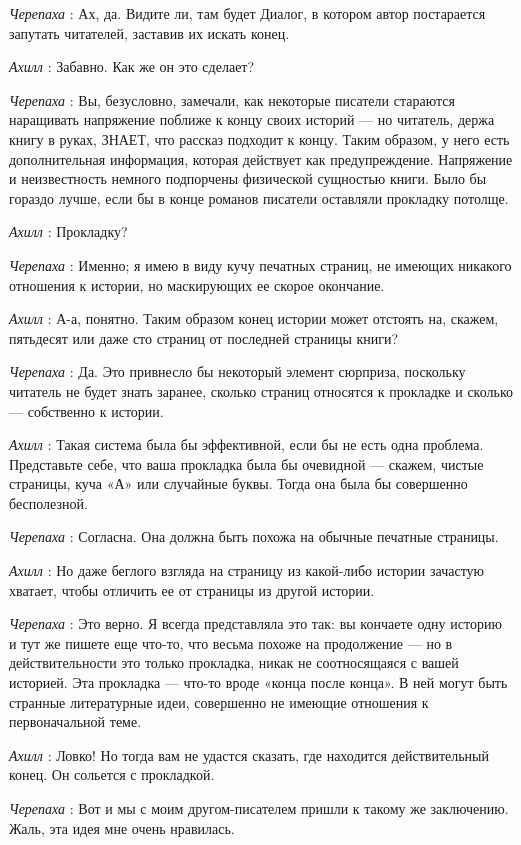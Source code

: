 \documentclass[../main.tex]{subfiles}
\begin{document}
\begin{dialogue}
\emph{Черепаха} : Ах, да. Видите ли, там будет Диалог, в котором автор постарается запутать читателей, заставив их искать конец.

\emph{Ахилл} : Забавно. Как же он это сделает?

\emph{Черепаха} : Вы, безусловно, замечали, как некоторые писатели стараются наращивать напряжение поближе к концу своих историй --- но читатель, держа книгу в руках, ЗНАЕТ, что рассказ подходит к концу. Таким образом, у него есть дополнительная информация, которая действует как предупреждение. Напряжение и неизвестность немного подпорчены физической сущностью книги. Было бы гораздо лучше, если бы в конце романов писатели оставляли прокладку потолще.

\emph{Ахилл} : Прокладку?

\emph{Черепаха} : Именно; я имею в виду кучу печатных страниц, не имеющих никакого отношения к истории, но маскирующих ее скорое окончание.

\emph{Ахилл} : А-а, понятно. Таким образом конец истории может отстоять на, скажем, пятьдесят или даже сто страниц от последней страницы книги?

\emph{Черепаха} : Да. Это привнесло бы некоторый элемент сюрприза, поскольку читатель не будет знать заранее, сколько страниц относятся к прокладке и сколько --- собственно к истории.

\emph{Ахилл} : Такая система была бы эффективной, если бы не есть одна проблема. Представьте себе, что ваша прокладка была бы очевидной --- скажем, чистые страницы, куча «А» или случайные буквы. Тогда она была бы совершенно бесполезной.

\emph{Черепаха} : Согласна. Она должна быть похожа на обычные печатные страницы.

\emph{Ахилл} : Но даже беглого взгляда на страницу из какой-либо истории зачастую хватает, чтобы отличить ее от страницы из другой истории.

\emph{Черепаха} : Это верно. Я всегда представляла это так: вы кончаете одну историю и тут же пишете еще что-то, что весьма похоже на продолжение --- но в действительности это только прокладка, никак не соотносящаяся с вашей историей. Эта прокладка --- что-то вроде «конца после конца». В ней могут быть странные литературные идеи, совершенно не имеющие отношения к первоначальной теме.

\emph{Ахилл} : Ловко! Но тогда вам не удастся сказать, где находится действительный конец. Он сольется с прокладкой.

\emph{Черепаха} : Вот и мы с моим другом-писателем пришли к такому же заключению. Жаль, эта идея мне очень нравилась.


\end{dialogue}
\end{document}
